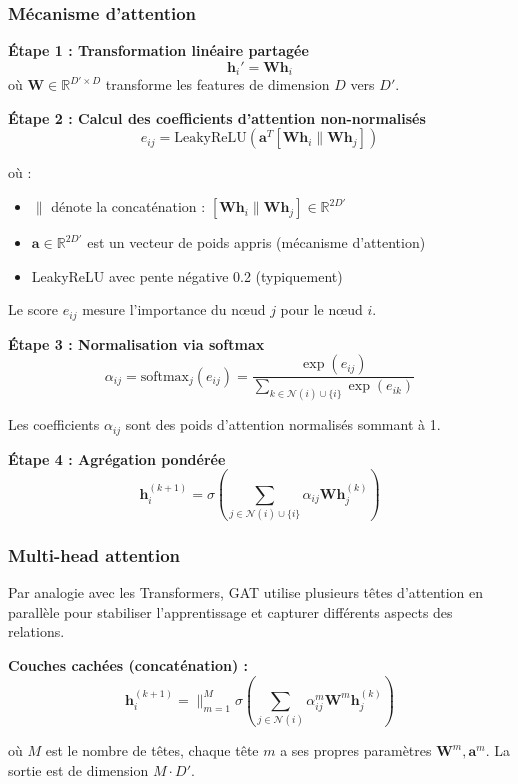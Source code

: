 \subsubsection{Mécanisme d'attention}

\textbf{Étape 1 : Transformation linéaire partagée}
\[
\mathbf{h}_i' = \mathbf{W}\mathbf{h}_i
\]
où $\mathbf{W} \in \mathbb{R}^{D' \times D}$ transforme les features de dimension $D$ vers $D'$.

\textbf{Étape 2 : Calcul des coefficients d'attention non-normalisés}
\[
e_{ij} = \text{LeakyReLU}\left(\mathbf{a}^T [\mathbf{W}\mathbf{h}_i \| \mathbf{W}\mathbf{h}_j]\right)
\]

où :
\begin{itemize}
    \item $\|$ dénote la concaténation : $[\mathbf{W}\mathbf{h}_i \| \mathbf{W}\mathbf{h}_j] \in \mathbb{R}^{2D'}$
    \item $\mathbf{a} \in \mathbb{R}^{2D'}$ est un vecteur de poids appris (mécanisme d'attention)
    \item LeakyReLU avec pente négative 0.2 (typiquement)
\end{itemize}

Le score $e_{ij}$ mesure l'importance du nœud $j$ pour le nœud $i$.

\textbf{Étape 3 : Normalisation via softmax}
\[
\alpha_{ij} = \text{softmax}_j(e_{ij}) = \frac{\exp(e_{ij})}{\sum_{k \in \mathcal{N}(i) \cup \{i\}} \exp(e_{ik})}
\]

Les coefficients $\alpha_{ij}$ sont des poids d'attention normalisés sommant à 1.

\textbf{Étape 4 : Agrégation pondérée}
\[
\mathbf{h}_i^{(k+1)} = \sigma\left(\sum_{j \in \mathcal{N}(i) \cup \{i\}} \alpha_{ij} \mathbf{W}\mathbf{h}_j^{(k)}\right)
\]

\subsubsection{Multi-head attention}

Par analogie avec les Transformers, GAT utilise plusieurs têtes d'attention en parallèle pour stabiliser l'apprentissage et capturer différents aspects des relations.

\textbf{Couches cachées (concaténation) :}
\[
\mathbf{h}_i^{(k+1)} = \|_{m=1}^M \sigma\left(\sum_{j \in \mathcal{N}(i)} \alpha_{ij}^m \mathbf{W}^m\mathbf{h}_j^{(k)}\right)
\]

où $M$ est le nombre de têtes, chaque tête $m$ a ses propres paramètres $\mathbf{W}^m, \mathbf{a}^m$. La sortie est de dimension $M \cdot D'$.

